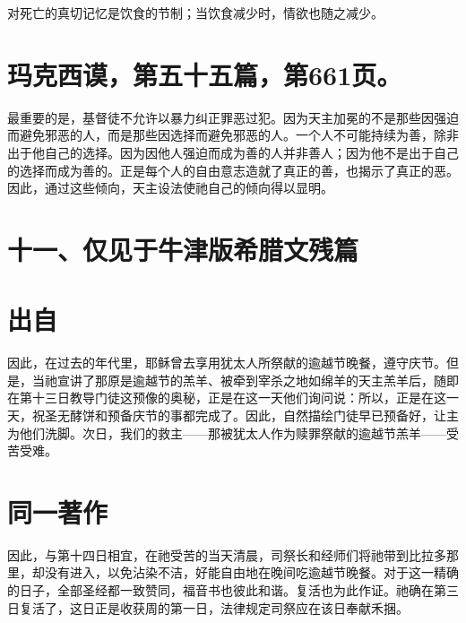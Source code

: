 对死亡的真切记忆是饮食的节制；当饮食减少时，情欲也随之减少。\par


\section{玛克西谟，第五十五篇，第661页。}

最重要的是，基督徒不允许以暴力纠正罪恶过犯。因为天主加冕的不是那些因强迫而避免邪恶的人，而是那些因选择而避免邪恶的人。一个人不可能持续为善，除非出于他自己的选择。因为因他人强迫而成为善的人并非善人；因为他不是出于自己的选择而成为善的。正是每个人的自由意志造就了真正的善，也揭示了真正的恶。因此，通过这些倾向，天主设法使祂自己的倾向得以显明。\par


\section{十一、仅见于牛津版希腊文残篇}


\section{出自}

因此，在过去的年代里，耶稣曾去享用犹太人所祭献的逾越节晚餐，遵守庆节。但是，当祂宣讲了那原是逾越节的羔羊、被牵到宰杀之地如绵羊的天主羔羊后，随即在第十三日教导门徒这预像的奥秘，正是在这一天他们询问说：所以，正是在这一天，祝圣无酵饼和预备庆节的事都完成了。因此，自然描绘门徒早已预备好，让主为他们洗脚。次日，我们的救主——那被犹太人作为赎罪祭献的逾越节羔羊——受苦受难。\par


\section{同一著作}

因此，与第十四日相宜，在祂受苦的当天清晨，司祭长和经师们将祂带到比拉多那里，却没有进入，以免沾染不洁，好能自由地在晚间吃逾越节晚餐。对于这一精确的日子，全部圣经都一致赞同，福音书也彼此和谐。复活也为此作证。祂确在第三日复活了，这日正是收获周的第一日，法律规定司祭应在该日奉献禾捆。\par

